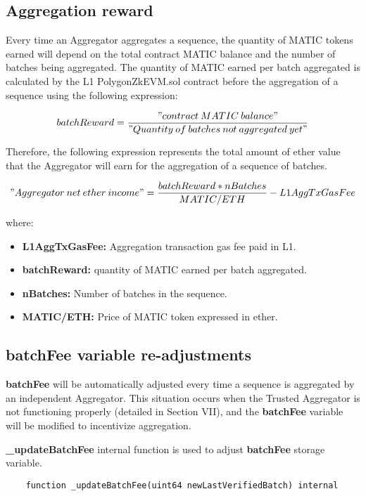 \subsection{Aggregation reward}

Every time an Aggregator aggregates a sequence, the quantity of MATIC tokens earned will depend on the total contract MATIC balance and the number of batches being aggregated. The quantity of MATIC earned per batch aggregated is calculated by the L1 PolygonZkEVM.sol contract before the aggregation of a sequence using the following expression:

$$ batchReward = \frac{"contract\:MATIC\:balance"}{"Quantity\:of\:batches\:not\:aggregated\:yet"}$$

Therefore, the following expression represents the total amount of ether value that the Aggregator will earn for the aggregation of a sequence of batches.

$$"Aggregator\:net\:ether\:income" = \frac{batchReward * nBatches}{MATIC/ETH} - L1AggTxGasFee$$

where:
\begin{itemize}
	\item \textbf{L1AggTxGasFee:} Aggregation transaction gas fee paid in L1.
	\item \textbf{batchReward:} quantity of MATIC earned per batch aggregated.
	\item \textbf{nBatches:} Number of batches in the sequence.
	\item \textbf{MATIC/ETH:} Price of MATIC token expressed in ether.
\end{itemize}


\subsection{\textbf{batchFee} variable re-adjustments}

 \textbf{batchFee} will be automatically adjusted every time a sequence is aggregated by an independent Aggregator. This situation occurs when the Trusted Aggregator is not functioning properly (detailed in Section VII), and the \textbf{batchFee} variable will be modified to incentivize aggregation.


\textbf{\_updateBatchFee} internal function is used to adjust \textbf{batchFee} storage variable.

\begin{lstlisting}
	function _updateBatchFee(uint64 newLastVerifiedBatch) internal 
\end{lstlisting}

